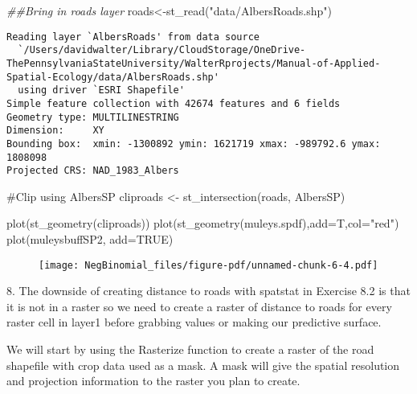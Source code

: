\documentclass[
  letterpaper,
]{book}
\newenvironment{Shaded}{\begin{snugshade}}{\end{snugshade}}
\newcommand{\AttributeTok}[1]{\textcolor[rgb]{0.40,0.45,0.13}{#1}}
\newcommand{\CommentTok}[1]{\textcolor[rgb]{0.37,0.37,0.37}{#1}}
\newcommand{\ConstantTok}[1]{\textcolor[rgb]{0.56,0.35,0.01}{#1}}
\newcommand{\DocumentationTok}[1]{\textcolor[rgb]{0.37,0.37,0.37}{\textit{#1}}}
\newcommand{\FunctionTok}[1]{\textcolor[rgb]{0.28,0.35,0.67}{#1}}
\newcommand{\NormalTok}[1]{\textcolor[rgb]{0.00,0.23,0.31}{#1}}
\newcommand{\OtherTok}[1]{\textcolor[rgb]{0.00,0.23,0.31}{#1}}
\newcommand{\StringTok}[1]{\textcolor[rgb]{0.13,0.47,0.30}{#1}}
\begin{document}
\begin{Shaded}
\begin{Highlighting}[]
\DocumentationTok{\#\#Bring in roads layer}
\NormalTok{roads}\OtherTok{\textless{}{-}}\FunctionTok{st\_read}\NormalTok{(}\StringTok{"data/AlbersRoads.shp"}\NormalTok{)}
\end{Highlighting}
\end{Shaded}

\begin{verbatim}
Reading layer `AlbersRoads' from data source 
  `/Users/davidwalter/Library/CloudStorage/OneDrive-ThePennsylvaniaStateUniversity/WalterRprojects/Manual-of-Applied-Spatial-Ecology/data/AlbersRoads.shp' 
  using driver `ESRI Shapefile'
Simple feature collection with 42674 features and 6 fields
Geometry type: MULTILINESTRING
Dimension:     XY
Bounding box:  xmin: -1300892 ymin: 1621719 xmax: -989792.6 ymax: 1808098
Projected CRS: NAD_1983_Albers
\end{verbatim}

\begin{Shaded}
\begin{Highlighting}[]
\CommentTok{\#Clip using AlbersSP}
\NormalTok{cliproads }\OtherTok{\textless{}{-}} \FunctionTok{st\_intersection}\NormalTok{(roads, AlbersSP)}

\FunctionTok{plot}\NormalTok{(}\FunctionTok{st\_geometry}\NormalTok{(cliproads))}
\FunctionTok{plot}\NormalTok{(}\FunctionTok{st\_geometry}\NormalTok{(muleys.spdf),}\AttributeTok{add=}\NormalTok{T,}\AttributeTok{col=}\StringTok{"red"}\NormalTok{)}
\FunctionTok{plot}\NormalTok{(muleysbuffSP2, }\AttributeTok{add=}\ConstantTok{TRUE}\NormalTok{)}
\end{Highlighting}
\end{Shaded}

\begin{figure}[H]

{\centering \texttt{[image: NegBinomial\_files/figure-pdf/unnamed-chunk-6-4.pdf]}

}

\end{figure}

8. The downside of creating distance to roads with spatstat in Exercise
8.2 is that it is not in a raster so we need to create a raster of
distance to roads for every raster cell in layer1 before grabbing values
or making our predictive surface.

We will start by using the Rasterize function to create a raster of the
road shapefile with crop data used as a mask. A mask will give the
spatial resolution and projection information to the raster you plan to
create.
\end{document}
